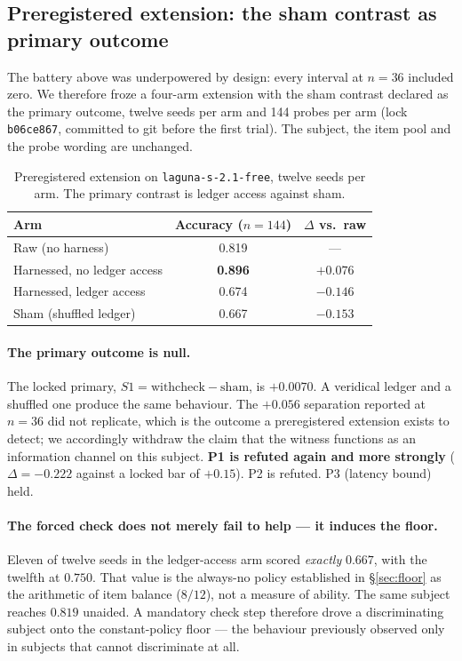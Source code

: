 \documentclass[11pt]{article}
\begin{document}
\subsection{Preregistered extension: the sham contrast as primary outcome}
\label{sec:n12}

The battery above was underpowered by design: every interval at $n=36$
included zero. We therefore froze a four-arm extension with the sham
contrast declared as the primary outcome, twelve seeds per arm and 144
probes per arm (lock \texttt{b06ce867}, committed to git before the first
trial). The subject, the item pool and the probe wording are unchanged.

\begin{table}[h]
\centering
\begin{tabular}{lcc}
\toprule
Arm & Accuracy ($n=144$) & $\Delta$ vs.\ raw \\
\midrule
Raw (no harness)              & 0.819 & --- \\
Harnessed, no ledger access   & \textbf{0.896} & $+0.076$ \\
Harnessed, ledger access      & 0.674 & $-0.146$ \\
Sham (shuffled ledger)        & 0.667 & $-0.153$ \\
\bottomrule
\end{tabular}
\caption{Preregistered extension on \texttt{laguna-s-2.1-free}, twelve seeds
per arm. The primary contrast is ledger access against sham.}
\label{tab:n12}
\end{table}

\paragraph{The primary outcome is null.} The locked primary,
$S1 = \text{withcheck} - \text{sham}$, is $+0.0070$. A veridical ledger and
a shuffled one produce the same behaviour. The $+0.056$ separation reported
at $n=36$ did not replicate, which is the outcome a preregistered extension
exists to detect; we accordingly withdraw the claim that the witness
functions as an information channel on this subject. \textbf{P1 is refuted
again and more strongly} ($\Delta = -0.222$ against a locked bar of
$+0.15$). P2 is refuted. P3 (latency bound) held.

\paragraph{The forced check does not merely fail to help --- it induces the
floor.} Eleven of twelve seeds in the ledger-access arm scored
\emph{exactly} $0.667$, with the twelfth at $0.750$. That value is the
always-no policy established in \S\ref{sec:floor} as the arithmetic of item
balance ($8/12$), not a measure of ability. The same subject reaches
$0.819$ unaided. A mandatory check step therefore drove a discriminating
subject onto the constant-policy floor --- the behaviour previously
observed only in subjects that cannot discriminate at all.
\end{document}
